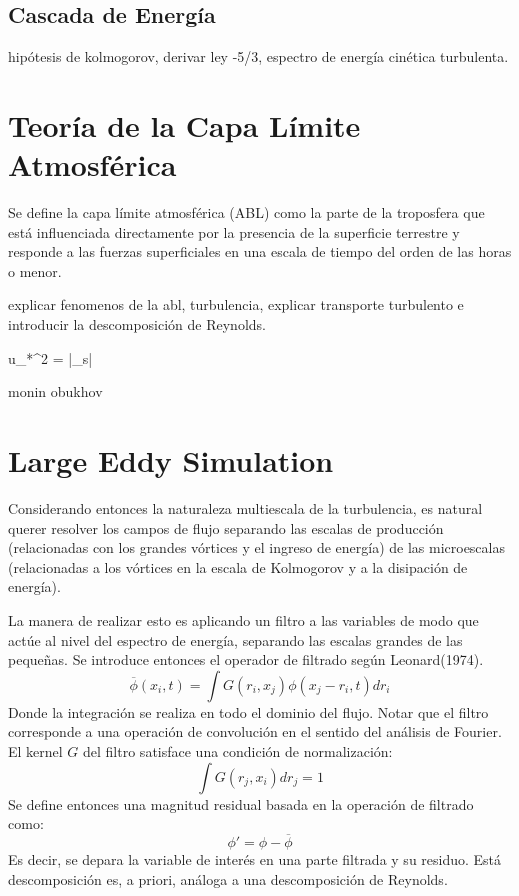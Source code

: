 \subsection{Cascada de Energía}
hipótesis de kolmogorov, derivar ley -5/3, espectro de energía cinética turbulenta.

\section{Teoría de la Capa Límite Atmosférica}
Se define la capa límite atmosférica (ABL) como la parte de la troposfera que está influenciada directamente por la presencia de la superficie terrestre y responde a las fuerzas superficiales en una escala de tiempo del orden de las horas o menor.

explicar fenomenos de la abl, turbulencia, explicar transporte turbulento e introducir la descomposición de Reynolds.

\be 
\rho u_*^2 = |\tau_s|
\ee

monin obukhov


\section{Large Eddy Simulation}
Considerando entonces la naturaleza multiescala de la turbulencia, es natural querer resolver los campos de flujo separando las escalas de producción (relacionadas con los grandes vórtices y el ingreso de energía) de las microescalas (relacionadas a los vórtices en la escala de Kolmogorov y a la disipación de energía). 

La manera de realizar esto es aplicando un filtro a las variables de modo que actúe al nivel del espectro de energía, separando las escalas grandes de las pequeñas. Se introduce entonces el operador de filtrado según Leonard(1974).
\begin{equation}
\overline{\phi}(x_i,t) = \int G(r_i,x_j)\phi(x_j-r_i,t)dr_i
\end{equation}
Donde la integración se realiza en todo el dominio del flujo. Notar que el filtro corresponde a una operación de convolución en el sentido del análisis de Fourier. El kernel $G$ del filtro satisface una condición de normalización:
\begin{equation}
\int G(r_j,x_i)dr_j = 1
\end{equation}
Se define entonces una magnitud residual basada en la operación de filtrado como:
\begin{equation}
\phi' = \phi - \overline{\phi}
\end{equation}
Es decir, se depara la variable de interés en una parte filtrada y su residuo. Está descomposición es, a priori, análoga a una descomposición de Reynolds.

